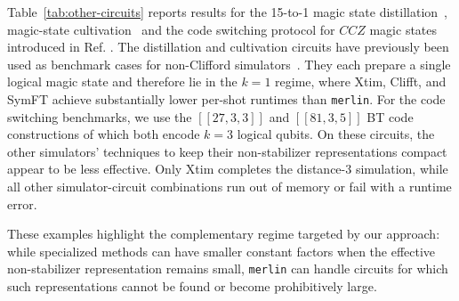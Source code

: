 Table~\ref{tab:other-circuits} reports results for the 15-to-1 magic state distillation~\cite{bravyi2005universal}, magic-state cultivation~\cite{gidney2024magic} and the code switching protocol for $CCZ$ magic states introduced in Ref. \cite{li2026transversal}.
The distillation and cultivation circuits have previously been used as benchmark cases for non-Clifford simulators~\cite{chase2026clifft,fang2026symft,surti2026efficient}.
They each prepare a single logical magic state and therefore lie in the $k=1$ regime, where Xtim, Clifft, and SymFT achieve substantially lower per-shot runtimes than \texttt{merlin}.
For the code switching benchmarks, we use the $[\![27,3,3]\!]$ and $[\![81,3,5]\!]$ BT code constructions of \cite{li2026transversal} which both encode $k = 3$ logical qubits.
On these circuits, the other simulators' techniques to keep their non-stabilizer representations compact appear to be less effective.
Only Xtim completes the distance-3 simulation, while all other simulator-circuit combinations run out of memory or fail with a runtime error.

These examples highlight the complementary regime targeted by our approach:
while specialized methods can have smaller constant factors when the effective non-stabilizer representation remains small, \texttt{merlin} can handle circuits for which such representations cannot be found or become prohibitively large.
